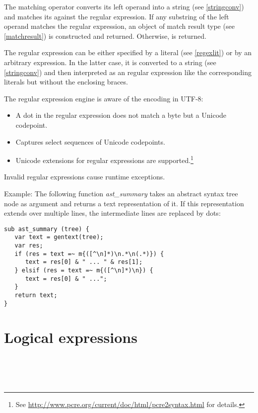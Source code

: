 \noindent
The matching operator converts its left operand into a string
(see \ref{stringconv}) and matches its against the regular
expression. If any substring of the
left operand matches the regular expression, an object of match
result type (see \ref{matchresult})
is constructed and returned. Otherwise,  is returned.

The regular expression can be either specified by a literal
(see \ref{regexlit}) or by an arbitrary expression. In the latter
case, it is converted to a string (see \ref{stringconv}) and
then interpreted as an regular expression like the corresponding
literals but without the enclosing braces.

The regular expression engine is aware of the encoding
in UTF-8:
\begin{itemize}
   \item A dot in the regular expression does not match a byte
      but a Unicode codepoint.
   \item Captures select sequences of Unicode codepoints.
   \item Unicode extensions for regular expressions are
      supported.\footnote{See
      \url{http://www.pcre.org/current/doc/html/pcre2syntax.html}
      for details.}
\end{itemize}

Invalid regular expressions cause runtime exceptions.

Example: The following function \textit{ast\_summary} takes
an abstract syntax tree node as argument and returns a
text representation of it. If this representation extends over
multiple lines, the intermediate lines are replaced by dots:

\begin{lstlisting}
sub ast_summary (tree) {
   var text = gentext(tree);
   var res;
   if (res = text =~ m{([^\n]*)\n.*\n(.*)}) {
      text = res[0] & " ... " & res[1];
   } elsif (res = text =~ m{([^\n]*)\n}) {
      text = res[0] & " ...";
   }
   return text;
}
\end{lstlisting}

\section{Logical expressions}

\begin{grammar}
      \produces {} \\
      \produces {}
         \lextoken{\&\&}  \\
      \produces {} \\
      \produces {}
         \lextoken{\barSY\barSY} 
\end{grammar}

